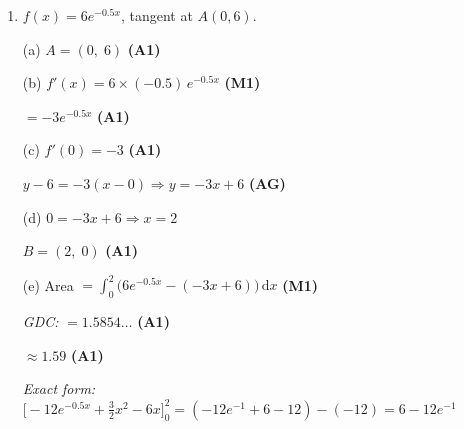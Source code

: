 \documentclass[12pt, twoside]{article}
\begin{document}
\begin{enumerate}[itemsep=0.4cm]
$x^3 - 3x + 2 = 0$

$(x - 1)^2(x + 2) = 0$ \hfill \textbf{(A1)}

$Q = (-2,\; -8)$ \hfill \textbf{(A1)}

\medskip
(d) Area $= \displaystyle\int_{-2}^{1} \bigl(x^3 - (3x - 2)\bigr)\,\mathrm{d}x$
\hfill \textbf{(M1)}

$= \displaystyle\int_{-2}^{1} (x^3 - 3x + 2)\,\mathrm{d}x$

$= \left[\dfrac{x^4}{4} - \dfrac{3x^2}{2} + 2x\right]_{-2}^{1}$
\hfill \textbf{(A1)(A1)}

$= \left(\dfrac{1}{4} - \dfrac{3}{2} + 2\right)
  - \left(\dfrac{16}{4} - \dfrac{12}{2} - 4\right)$
\hfill \textbf{(M1)}

$= \dfrac{3}{4} - (-6) = \dfrac{27}{4}$ \hfill \textbf{(A1)}

\bigskip

\item $f(x) = 6e^{-0.5x}$, tangent at $A(0, 6)$.

(a) $A = (0,\; 6)$ \hfill \textbf{(A1)}

\medskip
(b) $f'(x) = 6 \times (-0.5)\, e^{-0.5x}$ \hfill \textbf{(M1)}

$= -3e^{-0.5x}$ \hfill \textbf{(A1)}

\medskip
(c) $f'(0) = -3$ \hfill \textbf{(A1)}

$y - 6 = -3(x - 0) \Rightarrow y = -3x + 6$ \hfill \textbf{(AG)}

\medskip
(d) $0 = -3x + 6 \Rightarrow x = 2$

$B = (2,\; 0)$ \hfill \textbf{(A1)}

\medskip
(e) Area $= \displaystyle\int_0^2 \bigl(6e^{-0.5x} - (-3x + 6)\bigr)\,\mathrm{d}x$
\hfill \textbf{(M1)}

\emph{GDC:} $= 1.5854\ldots$ \hfill \textbf{(A1)}

$\approx 1.59$ \hfill \textbf{(A1)}

\medskip
\emph{Exact form:} $\bigl[-12e^{-0.5x} + \tfrac{3}{2}x^2 - 6x\bigr]_0^2
= (-12e^{-1} + 6 - 12) - (-12) = 6 - 12e^{-1}$

\end{enumerate}
\end{document}
